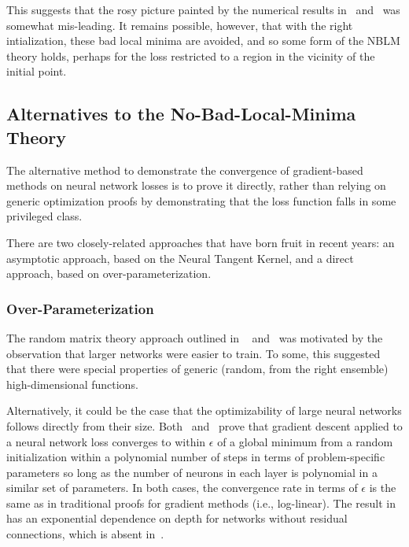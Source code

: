\documentclass[../../thesis.tex]{subfiles}
\begin{document}
This suggests that the rosy picture painted by the numerical results
in~\cite{dauphin2014} and~\cite{pennington2017}
was somewhat mis-leading.
It remains possible, however,
that with the right intialization,
these bad local minima
are avoided,
and so some form of the NBLM theory holds,
perhaps for the loss restricted to a region in the vicinity
of the initial point.

\subsection{Alternatives to the No-Bad-Local-Minima Theory}

The alternative method to
demonstrate the convergence of gradient-based methods
on neural network losses is to prove it directly,
rather than relying on generic optimization proofs
by demonstrating that the loss function falls in some
privileged class.

There are two closely-related approaches
that have born fruit in recent years:
an asymptotic approach, based on the Neural Tangent Kernel,
and a direct approach, based on over-parameterization.

\subsubsection{Over-Parameterization}

The random matrix theory approach outlined in%
~ and~
was motivated by the observation that larger networks
were easier to train.
To some, this suggested that there were special properties
of generic (random, from the right ensemble) high-dimensional functions.

Alternatively, it could be the case that the optimizability
of large neural networks follows directly from their size.
Both~\cite{allenzhu2018} and~\cite{du2018}
prove that gradient descent applied to a neural network loss
converges to within $\epsilon$ of a global minimum from a random initialization
within a polynomial number of steps in terms of
problem-specific parameters so long as the number of
neurons in each layer is polynomial in a similar set of parameters.
In both cases, the convergence rate in terms of $\epsilon$
is the same as in traditional proofs for gradient methods
(i.e., log-linear).
The result in~\cite{du2018} has an exponential dependence on depth for networks
without residual connections,
which is absent in~\cite{allenzhu2018}.
\end{document}
